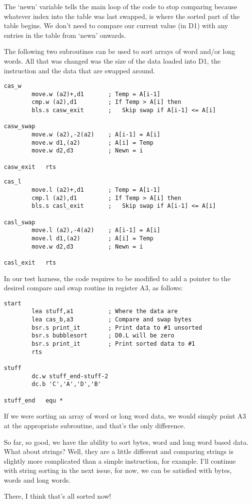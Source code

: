 The `newn' variable tells the main loop of the code to stop comparing because whatever index into the table was last swapped, is where the sorted part of the table begins. We don't need to compare our current value (in D1) with any entries in the table from `newn' onwards. 

The following two subroutines can be used to sort arrays of word and/or long words. All that was changed was the size of the data loaded into D1, the  instruction and the data that are swapped around.

\begin{lstlisting}[firstnumber=last,caption={Bubblesort - Compare and Swap - Words},label={lst:casWords}]
cas_w
        move.w (a2)+,d1       ; Temp = A[i-1]
        cmp.w (a2),d1         ; If Temp > A[i] then
        bls.s casw_exit       ;   Skip swap if A[i-1] <= A[i]

casw_swap
        move.w (a2),-2(a2)    ; A[i-1] = A[i]
        move.w d1,(a2)        ; A[i] = Temp
        move.w d2,d3          ; Newn = i

casw_exit   rts
\end{lstlisting}


\begin{lstlisting}[firstnumber=last,caption={Bubblesort - Compare and Swap - Long Words},label={lst:casLongs}]
cas_l
        move.l (a2)+,d1       ; Temp = A[i-1]
        cmp.l (a2),d1         ; If Temp > A[i] then
        bls.s casl_exit       ;   Skip swap if A[i-1] <= A[i]

casl_swap
        move.l (a2),-4(a2)    ; A[i-1] = A[i]
        move.l d1,(a2)        ; A[i] = Temp
        move.w d2,d3          ; Newn = i

casl_exit   rts
\end{lstlisting}

In our test harness, the code requires to be modified to add a pointer to the desired compare and swap routine in register A3, as follows:

\begin{lstlisting}[firstnumber=1,caption={Bubblesort Test Harness Revisited}]
start
        lea stuff,a1          ; Where the data are
        lea cas_b,a3          ; Compare and swap bytes
        bsr.s print_it        ; Print data to #1 unsorted
        bsr.s bubblesort      ; D0.L will be zero
        bsr.s print_it        ; Print sorted data to #1 
        rts

stuff
        dc.w stuff_end-stuff-2
        dc.b 'C','A','D','B'

stuff_end   equ *
\end{lstlisting}

If we were sorting an array of word or long word data, we would simply point A3 at the appropriate subroutine, and that's the only difference.

So far, so good, we have the ability to sort bytes, word and long word based data. What about strings? Well, they are a little different and comparing strings is slightly more complicated than a simple  instruction, for example. I'll continue with string sorting in the next issue, for now, we can be satisfied with bytes, words and long words. 

There, I think that's all sorted now!
